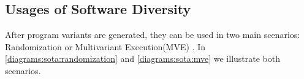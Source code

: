 

\subsection*{Usages of Software Diversity}

After program variants are generated, they can be used in two main scenarios: Randomization or Multivariant Execution(MVE) \cite{jackson}. In \autoref{diagrams:sota:randomization} and \autoref{diagrams:sota:mve} we illustrate both scenarios. 




